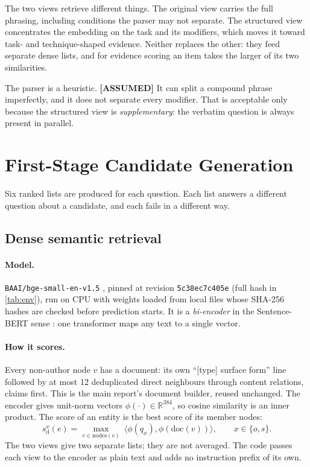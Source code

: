 \documentclass[11pt,a4paper]{article}
\newcommand{\cref}[1]{\autoref{#1}}
\theoremstyle{remark}
\newcommand{\code}[1]{\texttt{\small #1}}
\newcommand{\R}{\mathbb{R}}
\newcommand{\vtag}[2]{{\sffamily\scriptsize\bfseries\textcolor{#1}{[#2]}}}
\newcommand{\Atag}{\vtag{warnline}{ASSUMED}}
\begin{document}
The two views retrieve different things. The original view carries the full phrasing,
including conditions the parser may not separate. The structured view concentrates the
embedding on the task and its modifiers, which moves it toward task- and
technique-shaped evidence. Neither replaces the other: they feed separate dense lists,
and for evidence scoring an item takes the larger of its two similarities.

The parser is a heuristic. \Atag{} It can split a compound phrase imperfectly, and it
does not separate every modifier. That is acceptable only because the structured view is
\emph{supplementary}: the verbatim question is always present in parallel.

\section{First-Stage Candidate Generation}
\label{sec:channels}

Six ranked lists are produced for each question. Each list answers a different question
about a candidate, and each fails in a different way.

\subsection{Dense semantic retrieval}
\label{sec:dense}

\paragraph{Model.} \code{BAAI/bge-small-en-v1.5} \citep{xiao2023bge}, pinned at revision
\code{5c38ec7c405e} (full hash in \cref{tab:env}), run on CPU with weights loaded from
local files whose SHA-256 hashes are checked before prediction starts. It is a
\emph{bi-encoder} in the Sentence-BERT sense \citep{reimers2019sbert}: one transformer
maps any text to a single vector.

\paragraph{How it scores.} Every non-author node $v$ has a document: its own
``[type] surface form'' line followed by at most 12 deduplicated direct neighbours through
content relations, claims first. This is the main report's document builder, reused
unchanged. The encoder gives unit-norm vectors $\phi(\cdot)\in\R^{384}$, so cosine
similarity is an inner product. The score of an entity is the best score of its member
nodes:
\begin{equation}
  s_{\mathrm{d}}^{x}(e)=\max_{v\in\mathrm{nodes}(e)}\ \langle\phi(q_x),\phi(\mathrm{doc}(v))\rangle,
  \qquad x\in\{o,s\}.
\label{eq:dense}
\end{equation}
The two views give two separate lists; they are not averaged. The code passes each view
to the encoder as plain text and adds no instruction prefix of its own.
\end{document}
